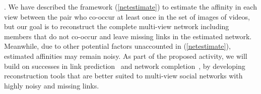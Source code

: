 
\label{sec:reconstruct}


. We have described the framework (\ref{netestimate}) to estimate the affinity in each view between the pair who co-occur at least once in the set of images of videos, but our goal is to reconstruct the complete multi-view network including members that do not co-occur and leave missing links in the estimated network. Meanwhile, due to other potential factors unaccounted in (\ref{netestimate}), estimated affinities may remain noisy.  As part of the proposed activity, we will build on successes in link prediction~\cite{Goldberg,Liben-Nowell,TaskarWAK03} and network completion~\cite{Clauset,Guimera,HannekeX09,KimL11}, by developing reconstruction tools that are better suited to multi-view social networks with highly noisy and missing links.


